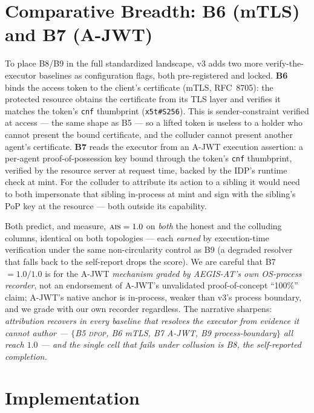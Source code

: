 \documentclass[11pt]{article}
\newcommand{\ais}{\textsc{ais}}
\newcommand{\code}[1]{\texttt{#1}}
\newcommand{\dpop}{\textsc{dpop}}
\begin{document}
\section{Comparative Breadth: B6 (mTLS) and B7 (A-JWT)}
\label{sec:b6b7}

To place B8/B9 in the full standardized landscape, v3 adds two more
verify-the-executor baselines as configuration flags, both pre-registered and
locked. \textbf{B6} binds the access token to the client's certificate (mTLS,
RFC~8705): the protected resource obtains the certificate from its TLS layer and
verifies it matches the token's \code{cnf} thumbprint (\code{x5t\#S256}). This is
sender-constraint verified at access --- the same shape as B5 --- so a lifted token
is useless to a holder who cannot present the bound certificate, and the colluder
cannot present another agent's certificate. \textbf{B7} reads the executor from
an A-JWT execution assertion: a per-agent proof-of-possession key bound through
the token's \code{cnf} thumbprint, verified by the resource server at request
time, backed by the IDP's
runtime check at mint. For the colluder to attribute its action to a sibling it
would need to both impersonate that sibling in-process at mint and sign with the
sibling's PoP key at the resource --- both outside its capability.

Both predict, and measure, $\ais{} = 1.0$ on \emph{both} the honest and the
colluding columns, identical on both topologies --- each \emph{earned} by
execution-time verification under the same non-circularity control as B9 (a
degraded resolver that falls back to the self-report drops the score). We are
careful that B7~$=1.0/1.0$ is for the A-JWT \emph{mechanism graded by AEGIS-AT's
own OS-process recorder}, not an endorsement of A-JWT's unvalidated
proof-of-concept ``100\%'' claim; A-JWT's native anchor is in-process, weaker than
v3's process boundary, and we grade with our own recorder regardless. The
narrative sharpens: \emph{attribution recovers in every baseline that resolves the
executor from evidence it cannot author --- $\{$B5 \dpop{}, B6 mTLS, B7 A-JWT, B9
process-boundary$\}$ all reach $1.0$ --- and the single cell that fails under
collusion is B8, the self-reported completion.}

\section{Implementation}
\label{sec:impl}
\end{document}
